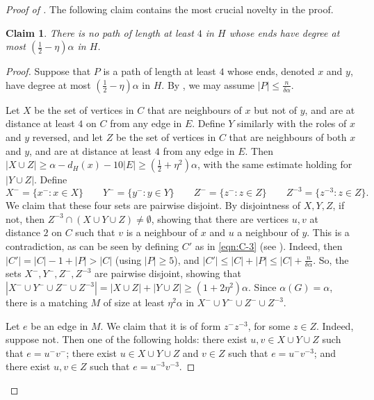 \documentclass[11pt,english]{article}
\theoremstyle{plain}
\newtheorem{claim}[theorem]{Claim}
\theoremstyle{definition}
\theoremstyle{remark}
\def \Xm {X^-}
\def \Zm {Z^-}
\def \Ym {Y^-}
\def \um {u^-}
\def \vm {v^-}
\def \xm {x^-}
\def \ym {y^-}
\def \zm {z^-}
\def \mthree{^{-3}}
\begin{document}
\begin{proof}[Proof of ]
			The following claim contains the most crucial novelty in the proof.

			\begin{claim} \label{claim:length-4}
				There is no path of length at least $4$ in $H$ whose ends have degree at most $(\frac{1}{2} - \eta)\alpha$ in $H$.
			\end{claim}

			\begin{proof}
				Suppose that $P$ is a path of length at least $4$ whose ends, denoted $x$ and $y$, have degree at most $(\frac{1}{2} - \eta)\alpha$ in $H$. By , we may assume $|P| \le \frac{n}{\delta\alpha}$.

				Let $X$ be the set of vertices in $C$ that are neighbours of $x$ but not of $y$, and are at distance at least $4$ on $C$ from any edge in $E$. Define $Y$ similarly with the roles of $x$ and $y$ reversed, and let $Z$ be the set of vertices in $C$ that are neighbours of both $x$ and $y$, and are at distance at least $4$ from any edge in $E$. Then $|X \cup Z| \ge \alpha - d_H(x) - 10|E| \ge (\frac{1}{2} + \eta^2)\alpha$, with the same estimate holding for $|Y \cup Z|$. Define 
				\begin{equation*}
					\Xm = \{\xm : x \in X\} \qquad
					\Ym = \{\ym : y \in Y\} \qquad
					\Zm = \{\zm : z \in Z\} \qquad
					Z\mthree = \{z\mthree : z \in Z\}. 
				\end{equation*}
				We claim that these four sets are pairwise disjoint. By disjointness of $X, Y, Z$, if not, then $Z\mthree \cap (X \cup Y \cup Z) \neq \emptyset$, showing that there are vertices $u, v$ at distance $2$ on $C$ such that $v$ is a neighbour of $x$ and $u$ a neighbour of $y$.
				This is a contradiction, as can be seen by defining $C'$ as in \eqref{eqn:C-3} (see ).
				Indeed, then $|C'| = |C| - 1 + |P| > |C|$ (using $|P| \ge 5$), and $|C'| \le |C| + |P| \le |C| + \frac{n}{\delta \alpha}$.
				So, the sets $\Xm, \Ym, \Zm, Z\mthree$ are pairwise disjoint, showing that $|\Xm \cup \Ym \cup \Zm \cup Z\mthree| = |X \cup Z| + |Y \cup Z| \ge (1 + 2\eta^2)\alpha$.
				Since $\alpha(G) = \alpha$, there is a matching $M$ of size at least $\eta^2 \alpha$ in $\Xm \cup \Ym \cup \Zm \cup Z\mthree$. 

				Let $e$ be an edge in $M$. We claim that it is of form $\zm z\mthree$, for some $z \in Z$.
				Indeed, suppose not. Then one of the following holds: there exist $u,v \in X \cup Y \cup Z$ such that $e = \um\vm$; there exist $u \in X \cup Y \cup Z$ and $v \in Z$ such that $e = \um v\mthree$; and there exist $u,v \in Z$ such that $e = u\mthree v\mthree$.


\end{proof}
\end{proof}
\end{document}

